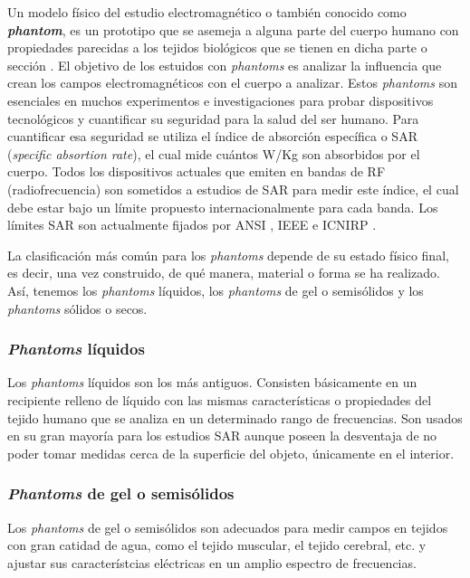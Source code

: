 Un modelo físico del estudio electromagnético o también conocido como \textbf{\textit{phantom}}, es un prototipo que se asemeja a alguna parte del cuerpo humano con propiedades parecidas a los tejidos biológicos que se tienen en dicha parte o sección \cite{yang}. El objetivo de los estuidos con \textit{phantoms} es analizar la influencia que crean los campos electromagnéticos con el cuerpo a analizar. Estos \textit{phantoms} son esenciales en muchos experimentos e investigaciones para probar dispositivos tecnológicos y cuantificar su seguridad para la salud del ser humano. Para cuantificar esa seguridad se utiliza el índice de absorción específica o SAR (\textit{specific absortion rate}), el cual mide cuántos W/Kg son absorbidos por el cuerpo. Todos los dispositivos actuales que emiten en bandas de RF (radiofrecuencia) son sometidos a estudios de SAR para medir este índice, el cual debe estar bajo un límite propuesto internacionalmente para cada banda. Los límites SAR son actualmente fijados por ANSI \cite{ANSI}, IEEE \cite{IEEE} e ICNIRP \cite{ICNIRP}.

La clasificación más común para los \textit{phantoms} depende de su estado físico final, es decir, una vez construido, de qué manera, material o forma se ha realizado. Así, tenemos los \textit{phantoms} líquidos, los \textit{phantoms} de gel o semisólidos y los \textit{phantoms} sólidos o secos.

\subsubsection{\textit{Phantoms} líquidos}

Los \textit{phantoms} líquidos son los más antiguos. Consisten básicamente en un recipiente relleno de líquido con las mismas características o propiedades del tejido humano que se analiza en un determinado rango de frecuencias. Son usados en su gran mayoría para los estudios SAR aunque poseen la desventaja de no poder tomar medidas cerca de la superficie del objeto, únicamente en el interior.

\subsubsection{\textit{Phantoms} de gel o semisólidos}

Los \textit{phantoms} de gel o semisólidos son adecuados para medir campos en tejidos con gran catidad de agua, como el tejido muscular, el tejido cerebral, etc. y ajustar sus característcias eléctricas en un amplio espectro de frecuencias.

